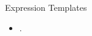 \begin{frame}{Expression Templates}                                                                                                              
\begin{itemize}
\item .
\end{itemize}
\end{frame}
